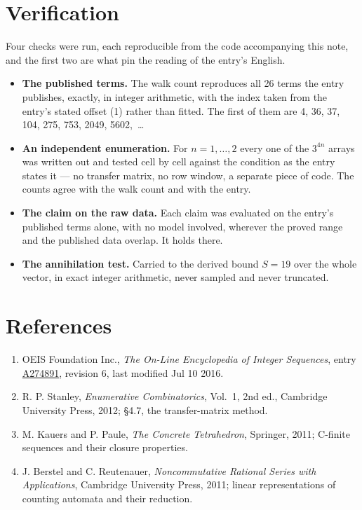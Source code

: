 \documentclass[11pt]{article}
\theoremstyle{definition}
\begin{document}
\section{Verification}

Four checks were run, each reproducible from the code accompanying this note, and the first two are what pin the reading of the entry's English.

\begin{itemize}

\item {\bfseries The published terms.} The walk count reproduces all 26 terms the entry publishes, exactly, in integer arithmetic, with the index taken from the entry's stated offset (1) rather than fitted. The first of them are 4, 36, 37, 104, 275, 753, 2049, 5602,~\dots

\item {\bfseries An independent enumeration.} For $n = 1,\dots,2$ every one of the $3^{4n}$ arrays was written out and tested cell by cell against the condition as the entry states it --- no transfer matrix, no row window, a separate piece of code. The counts agree with the walk count and with the entry.

\item {\bfseries The claim on the raw data.} Each claim was evaluated on the entry's published terms alone, with no model involved, wherever the proved range and the published data overlap. It holds there.

\item {\bfseries The annihilation test.} Carried to the derived bound $S = 19$ over the whole vector, in exact integer arithmetic, never sampled and never truncated.

\end{itemize}

\section{References}

\begin{enumerate}

\item OEIS Foundation Inc., \emph{The On-Line Encyclopedia of Integer Sequences}, entry \href{https://oeis.org/A274891}{A274891}, revision 6, last modified Jul 10 2016.

\item R. P. Stanley, \emph{Enumerative Combinatorics}, Vol.~1, 2nd ed., Cambridge University Press, 2012; \S4.7, the transfer-matrix method.

\item M. Kauers and P. Paule, \emph{The Concrete Tetrahedron}, Springer, 2011; C-finite sequences and their closure properties.

\item J. Berstel and C. Reutenauer, \emph{Noncommutative Rational Series with Applications}, Cambridge University Press, 2011; linear representations of counting automata and their reduction.

\end{enumerate}
\end{document}
